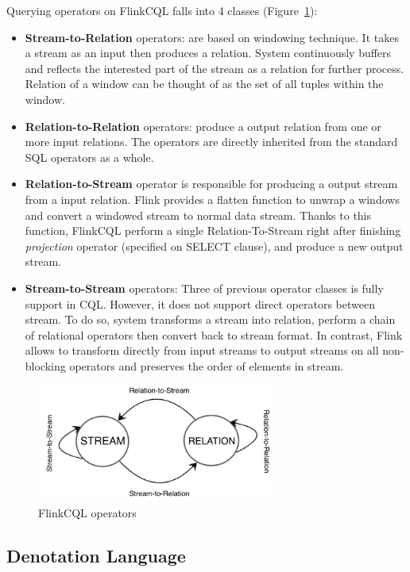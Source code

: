 Querying operators on FlinkCQL falls into 4 classes (Figure~\ref{fig:relation}):
\begin{itemize}
	\item \textbf{Stream-to-Relation} operators: are based on windowing technique. It takes a stream as an input then produces a relation. System continuously buffers and reflects the interested part of the stream as a relation for further process. Relation of a window can be thought of as the set of all tuples within the window.
	\item  \textbf{Relation-to-Relation} operators: produce a output relation from one or more input relations. The operators are directly inherited from the standard SQL operators as a whole.
	\item \textbf{Relation-to-Stream} operator is responsible for producing a output stream from a input relation. Flink provides a flatten function to unwrap a windows and convert a windowed stream to normal data stream. Thanks to this function, FlinkCQL perform a single Relation-To-Stream right after finishing \textit{projection} operator (specified on SELECT clause), and produce a new output stream.
	\item \textbf{Stream-to-Stream} operators: Three of previous operator classes is fully support in CQL. However, it does not support direct operators between stream. To do so, system transforms a stream into relation, perform a chain of relational operators then convert back to stream format. In contrast, Flink allows to transform directly from input streams to output streams on all non-blocking operators and preserves the order of elements in stream.
\end{itemize}
\begin{figure}[htbp!] 
\centering    
\includegraphics[width=0.7\textwidth]{relation}
\caption{FlinkCQL operators}
\label{fig:relation}
\end{figure}


\subsection*{Denotation Language}
